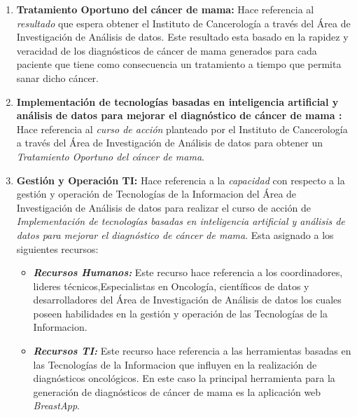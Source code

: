 \begin{enumerate}[label=\textbf{\arabic*})]
	
\item  \textbf{Tratamiento Oportuno del cáncer de mama:} Hace referencia al \textit{resultado} que espera obtener el Instituto de Cancerología a través del Área de Investigación de Análisis de datos. Este resultado esta basado en la rapidez y veracidad de los diagnósticos de cáncer de mama generados para cada paciente que tiene como consecuencia un tratamiento a tiempo que permita sanar dicho cáncer.

\item  \textbf{Implementación de tecnologías basadas en  inteligencia artificial y análisis de datos para 	mejorar  el diagnóstico de cáncer de mama :} Hace referencia al \textit{curso de acción} planteado por el Instituto de Cancerología a través del Área de Investigación de Análisis de datos para obtener un \textit{Tratamiento Oportuno del cáncer de mama}.

\item  \textbf{Gestión y Operación TI:} Hace referencia a la \textit{capacidad} con respecto a la gestión y operación de Tecnologías de la Informacion del Área de Investigación de Análisis de datos para realizar el curso de acción de \textit{Implementación de tecnologías basadas en  inteligencia artificial y análisis de datos para 	mejorar  el diagnóstico de cáncer de mama}. Esta asignado a los siguientes recursos:

\begin{itemize}
	\item  \textbf{\textit{Recursos Humanos:}} Este recurso hace referencia a los coordinadores, lideres técnicos,Especialistas en Oncología, científicos de datos  y desarrolladores del Área de Investigación de Análisis de datos los cuales poseen habilidades en la gestión y operación de las Tecnologías de la Informacion.
	
	\item  \textbf{\textit{Recursos TI:}} Este recurso hace referencia a las herramientas basadas en las Tecnologías de la Informacion que influyen en la realización de diagnósticos oncológicos. En este caso la principal herramienta para la generación de diagnósticos de cáncer de mama es la aplicación web \textit{BreastApp}.
\end{itemize}
	
 \end{enumerate}

\newpage
